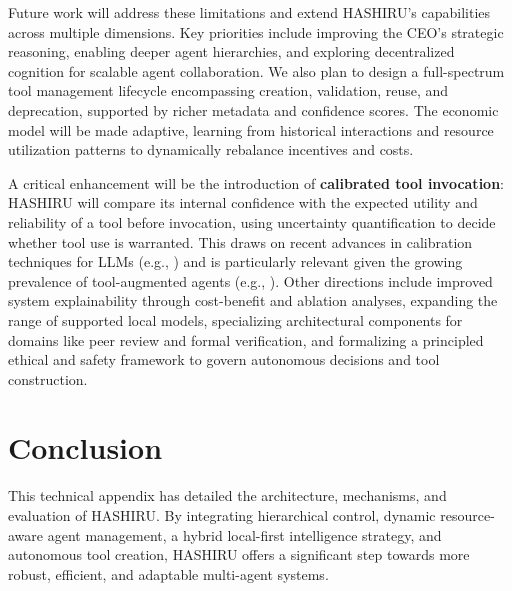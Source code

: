 \documentclass[twocolumn]{article}
\begin{document}
Future work will address these limitations and extend HASHIRU's capabilities across multiple dimensions. Key priorities include improving the CEO's strategic reasoning, enabling deeper agent hierarchies, and exploring decentralized cognition for scalable agent collaboration. We also plan to design a full-spectrum tool management lifecycle encompassing creation, validation, reuse, and deprecation, supported by richer metadata and confidence scores. The economic model will be made adaptive, learning from historical interactions and resource utilization patterns to dynamically rebalance incentives and costs.

A critical enhancement will be the introduction of \textbf{calibrated tool invocation}: HASHIRU will compare its internal confidence with the expected utility and reliability of a tool before invocation, using uncertainty quantification to decide whether tool use is warranted. This draws on recent advances in calibration techniques for LLMs (e.g., \cite{manggalaqa, spiess2024calibration}) and is particularly relevant given the growing prevalence of tool-augmented agents (e.g., \cite{Qin2023ToolLLM}). Other directions include improved system explainability through cost-benefit and ablation analyses, expanding the range of supported local models, specializing architectural components for domains like peer review and formal verification, and formalizing a principled ethical and safety framework to govern autonomous decisions and tool construction.
\section{Conclusion}
This technical appendix has detailed the architecture, mechanisms, and evaluation of HASHIRU. By integrating hierarchical control, dynamic resource-aware agent management, a hybrid local-first intelligence strategy, and autonomous tool creation, HASHIRU offers a significant step towards more robust, efficient, and adaptable multi-agent systems.




\end{document}
